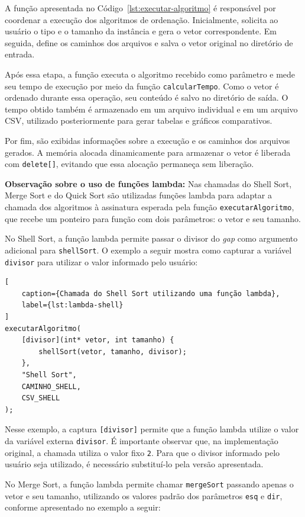A função apresentada no Código~\ref{lst:executar-algoritmo} é responsável por coordenar a execução dos algoritmos de ordenação. Inicialmente, solicita ao usuário o tipo e o tamanho da instância e gera o vetor correspondente. Em seguida, define os caminhos dos arquivos e salva o vetor original no diretório de entrada.

Após essa etapa, a função executa o algoritmo recebido como parâmetro e mede seu tempo de execução por meio da função \texttt{calcularTempo}. Como o vetor é ordenado durante essa operação, seu conteúdo é salvo no diretório de saída. O tempo obtido também é armazenado em um arquivo individual e em um arquivo CSV, utilizado posteriormente para gerar tabelas e gráficos comparativos.

Por fim, são exibidas informações sobre a execução e os caminhos dos arquivos gerados. A memória alocada dinamicamente para armazenar o vetor é liberada com \texttt{delete[]}, evitando que essa alocação permaneça sem liberação.

\textbf{Observação sobre o uso de funções lambda:} Nas chamadas do Shell Sort, Merge Sort e do Quick Sort são utilizadas funções lambda para adaptar a chamada dos algoritmos à assinatura esperada pela função \texttt{executarAlgoritmo}, que recebe um ponteiro para função com dois parâmetros: o vetor e seu tamanho.

No Shell Sort, a função lambda permite passar o divisor do \textit{gap} como argumento adicional para \texttt{shellSort}. O exemplo a seguir mostra como capturar a variável \texttt{divisor} para utilizar o valor informado pelo usuário:

\begin{lstlisting}[
    caption={Chamada do Shell Sort utilizando uma função lambda},
    label={lst:lambda-shell}
]
executarAlgoritmo(
    [divisor](int* vetor, int tamanho) {
        shellSort(vetor, tamanho, divisor);
    },
    "Shell Sort",
    CAMINHO_SHELL,
    CSV_SHELL
);
\end{lstlisting}

Nesse exemplo, a captura \texttt{[divisor]} permite que a função lambda utilize o valor da variável externa \texttt{divisor}. É importante observar que, na implementação original, a chamada utiliza o valor fixo \texttt{2}. Para que o divisor informado pelo usuário seja utilizado, é necessário substituí-lo pela versão apresentada.

No Merge Sort, a função lambda permite chamar \texttt{mergeSort} passando apenas o vetor e seu tamanho, utilizando os valores padrão dos parâmetros \texttt{esq} e \texttt{dir}, conforme apresentado no exemplo a seguir:

